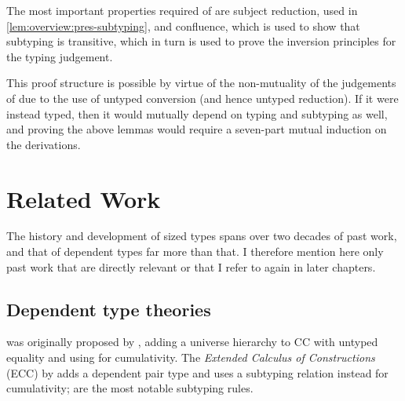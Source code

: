 The most important properties required of \lang are subject reduction,
used in \cref{lem:overview:pres-subtyping},
and confluence, which is used to show that subtyping is transitive,
which in turn is used to prove the inversion principles for the typing judgement.

This proof structure is possible by virtue of the non-mutuality of the judgements of \lang
due to the use of untyped conversion (and hence untyped reduction).
If it were instead typed, then it would mutually depend on typing and subtyping as well,
and proving the above lemmas would require a seven-part mutual induction on the derivations.

\section{Related Work}

The history and development of sized types spans over two decades of past work,
and that of dependent types far more than that.
I therefore mention here only past work that are directly relevant
or that I refer to again in later chapters.

\subsection{Dependent type theories}

\GCC{}
was originally proposed by \citet{GCC-Coquand},
adding a universe hierarchy to CC with untyped equality
and using  for cumulativity.
The \emph{Extended Calculus of Constructions}
(ECC) by \citet{ECC} adds a dependent pair type
and uses a subtyping relation instead for cumulativity;
 are the most notable subtyping rules.

\vspace{-\baselineskip}

